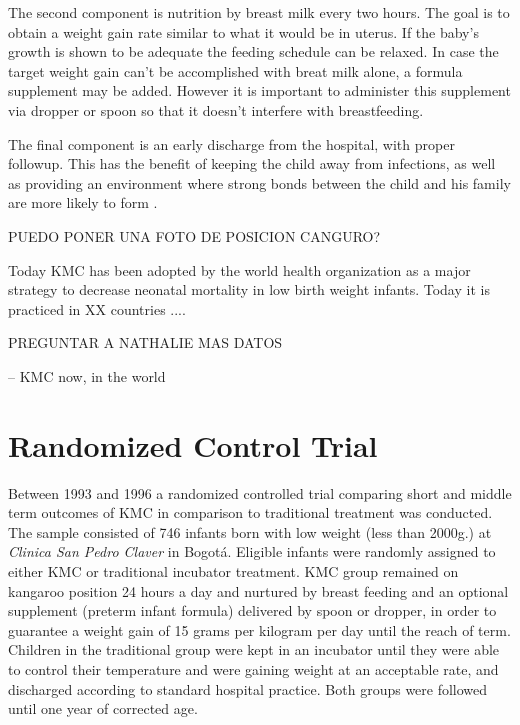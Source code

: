 The second component is nutrition by breast milk every two hours. The goal is to obtain a weight gain rate similar to what it would be in uterus. If the baby's growth is shown to be adequate the feeding schedule can be relaxed. In case the target weight gain can't be accomplished with breat milk alone, a formula supplement may be added. However it is important to administer this supplement via dropper or spoon so that it doesn't interfere with breastfeeding.

The final component is an early discharge from the hospital, with proper followup. This has the benefit of keeping the child away from infections, as well as providing an environment where strong bonds between the child and his family are more likely to form \autocite{charpak_kangaroo_2005}. 

PUEDO PONER UNA FOTO DE POSICION CANGURO?


Today KMC has been adopted by the world health organization as a major strategy to decrease neonatal mortality in low birth weight infants. Today it is practiced in XX countries .... 

PREGUNTAR A NATHALIE MAS DATOS

-- KMC now, in the world

\section{Randomized Control Trial}

Between 1993 and 1996 a randomized controlled trial comparing short and middle term outcomes of KMC in comparison to traditional treatment was conducted. The sample consisted of 746 infants born with low weight (less than 2000g.) at \emph{Clinica San Pedro Claver} in Bogotá. Eligible infants were randomly assigned to either KMC or traditional incubator treatment. KMC group remained on kangaroo position 24 hours a day and nurtured by breast feeding and an optional supplement (preterm infant formula) delivered by spoon or dropper, in order to guarantee a weight gain of 15 grams per kilogram per day until the reach of term. Children in the traditional group were kept in an incubator until they were able to control their temperature and were gaining weight at an acceptable rate, and discharged according to standard hospital practice. Both groups were followed until one year of corrected age. 

